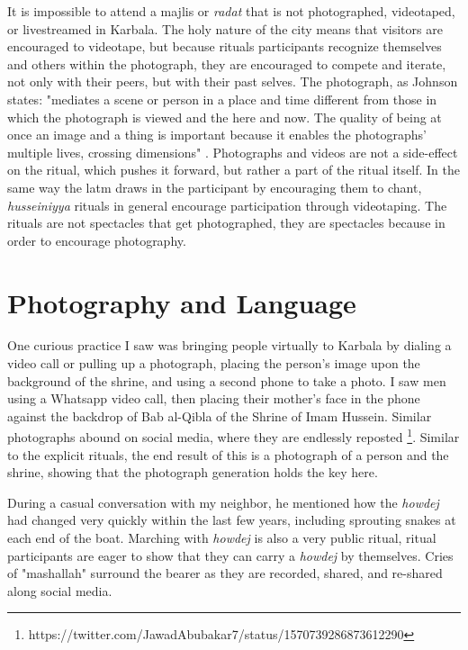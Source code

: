 It is impossible to attend a majlis or \emph{radat} that is not photographed, videotaped, or livestreamed in Karbala. The holy nature of the city means that visitors are encouraged to videotape, but because rituals participants recognize themselves and others within the photograph, they are encouraged to compete and iterate, not only with their peers, but with their past selves. The photograph, as Johnson states: "mediates a scene or person in a place and time different from those in which the photograph is viewed and the here and now. The quality of being at once an image and a thing is important because it enables the photographs’ multiple lives, crossing dimensions" \cite[92]{johnson_automatic_2020}. Photographs and videos are not a side-effect on the ritual, which pushes it forward, but rather a part of the ritual itself. In the same way the latm draws in the participant by encouraging them to chant, \emph{husseiniyya} rituals in general encourage participation through videotaping. The rituals are not spectacles that get photographed, they are spectacles because in order to encourage photography. 

\section{Photography and Language}
One curious practice I saw was bringing people virtually to Karbala by dialing a video call or pulling up a photograph, placing the person’s image upon the background of the shrine, and using a second phone to take a photo. I saw men using a Whatsapp video call, then placing their mother’s face in the phone against the backdrop of Bab al-Qibla of the Shrine of Imam Hussein. Similar photographs abound on social media, where they are endlessly reposted \footnote{https://twitter.com/JawadAbubakar7/status/1570739286873612290}. Similar to the explicit rituals, the end result of this is a photograph of a person and the shrine, showing that the photograph generation holds the key here. 

During a casual conversation with my neighbor, he mentioned how the \emph{howdej} had changed very quickly within the last few years, including sprouting snakes at each end of the boat. Marching with \emph{howdej} is also a very public ritual, ritual participants are eager to show that they can carry a \emph{howdej} by themselves. Cries of "mashallah" surround the bearer as they are recorded, shared, and re-shared along social media. 

